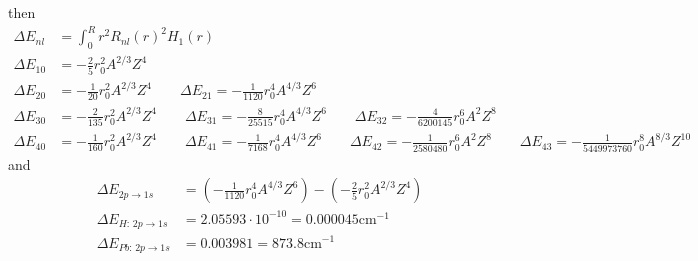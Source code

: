 \documentclass[../main.tex]{subfiles}
\begin{document}
then
\begin{align}
\Delta E_{nl}&=\int_0^Rr^2R_{nl}(r)^2H_1(r)\\
\Delta E_{10}&=-\frac{2}{5}r_0^2A^{2/3}Z^4\\
\Delta E_{20}&=-\frac{1}{20}r_0^2A^{2/3}Z^4\qquad
\Delta E_{21}=-\frac{1}{1120}r_0^4A^{4/3}Z^6\\
\Delta E_{30}&=-\frac{2}{135}r_0^2A^{2/3}Z^4\qquad
\Delta E_{31}=-\frac{8}{25515}r_0^4A^{4/3}Z^6\qquad
\Delta E_{32}=-\frac{4}{6200145}r_0^6A^{2}Z^8\\
\Delta E_{40}&=-\frac{1}{160}r_0^2A^{2/3}Z^4\qquad
\Delta E_{41}=-\frac{1}{7168}r_0^4A^{4/3}Z^6\qquad
\Delta E_{42}=-\frac{1}{2580480}r_0^6A^{2}Z^8\qquad
\Delta E_{43}=-\frac{1}{5449973760}r_0^8A^{8/3}Z^10
\end{align}
and
\begin{align}
\Delta E_{2p\rightarrow1s}&=\left(-\frac{1}{1120}r_0^4A^{4/3}Z^6\right)-\left(-\frac{2}{5}r_0^2A^{2/3}Z^4\right)\\
\Delta E_{H:\,2p\rightarrow1s}&=2.05593\cdot10^{-10}=0.000045\text{cm}^{-1}\\
\Delta E_{Pb:\,2p\rightarrow1s}&=0.003981=873.8\text{cm}^{-1}
\end{align}
\end{document}
